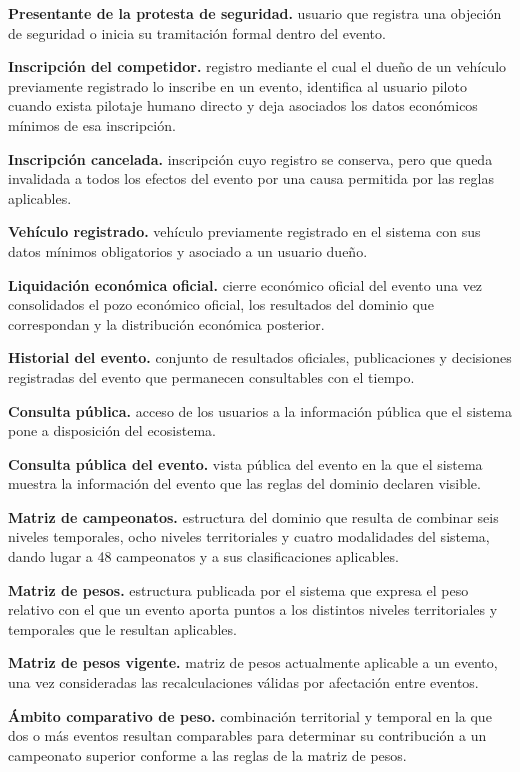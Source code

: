 \documentclass[10pt,letterpaper]{article}
\begin{document}
\noindent\textbf{Presentante de la protesta de seguridad.} usuario que registra una objeción de seguridad o inicia su tramitación formal dentro del evento.\par
\noindent\textbf{Inscripción del competidor.} registro mediante el cual el dueño de un vehículo previamente registrado lo inscribe en un evento, identifica al usuario piloto cuando exista pilotaje humano directo y deja asociados los datos económicos mínimos de esa inscripción.\par
\noindent\textbf{Inscripción cancelada.} inscripción cuyo registro se conserva, pero que queda invalidada a todos los efectos del evento por una causa permitida por las reglas aplicables.\par
\noindent\textbf{Vehículo registrado.} vehículo previamente registrado en el sistema con sus datos mínimos obligatorios y asociado a un usuario dueño.\par
\noindent\textbf{Liquidación económica oficial.} cierre económico oficial del evento una vez consolidados el pozo económico oficial, los resultados del dominio que correspondan y la distribución económica posterior.\par
\noindent\textbf{Historial del evento.} conjunto de resultados oficiales, publicaciones y decisiones registradas del evento que permanecen consultables con el tiempo.\par
\noindent\textbf{Consulta pública.} acceso de los usuarios a la información pública que el sistema pone a disposición del ecosistema.\par
\noindent\textbf{Consulta pública del evento.} vista pública del evento en la que el sistema muestra la información del evento que las reglas del dominio declaren visible.\par
\noindent\textbf{Matriz de campeonatos.} estructura del dominio que resulta de combinar seis niveles temporales, ocho niveles territoriales y cuatro modalidades del sistema, dando lugar a 48 campeonatos y a sus clasificaciones aplicables.\par
\noindent\textbf{Matriz de pesos.} estructura publicada por el sistema que expresa el peso relativo con el que un evento aporta puntos a los distintos niveles territoriales y temporales que le resultan aplicables.\par
\noindent\textbf{Matriz de pesos vigente.} matriz de pesos actualmente aplicable a un evento, una vez consideradas las recalculaciones válidas por afectación entre eventos.\par
\noindent\textbf{Ámbito comparativo de peso.} combinación territorial y temporal en la que dos o más eventos resultan comparables para determinar su contribución a un campeonato superior conforme a las reglas de la matriz de pesos.\par
\end{document}
